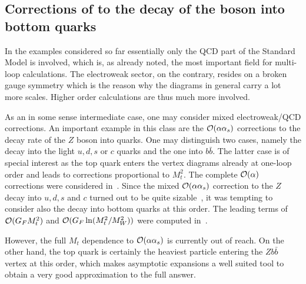 \subsection[Corrections of ${\cal O}(\alpha\alpha_s)$ to the decay of
the $Z$ boson into bottom quarks]{Corrections of  to the decay of the  boson into bottom
  quarks\label{sec::zbb}}
%
In the examples considered so far essentially only the QCD part of the
Standard Model is involved, which is, as already noted, the most
important field for multi-loop calculations. The electroweak sector, on
the contrary, resides on a broken gauge symmetry which is the reason why
the diagrams in general carry a lot more scales. Higher order
calculations are thus much more involved.

As an in some sense intermediate case, one may consider mixed
electroweak/QCD corrections. An important example in this class are the
${\cal O}(\alpha\alpha_s)$ corrections to the decay rate of the $Z$
boson into quarks.  One may distinguish two cases, namely the decay into
the light $u,d,s$ or $c$ quarks and the one into $b\bar{b}$.  The latter
case is of special interest as the top quark enters the vertex diagrams
already at one-loop order and leads to corrections proportional to
$M_t^2$.  The complete ${\cal O}(\alpha)$ corrections were considered
in~\cite{AkhBarRie86,BeeHol88}.  Since the mixed ${\cal
  O}(\alpha\alpha_s)$ correction to the $Z$ decay into $u,d,s$ and $c$
turned out to be quite sizable~\cite{CzaKue96}, it was tempting to
consider also the decay into bottom quarks at this order.  The leading
terms of ${\cal O}(G_F M_t^2)$ and ${\cal O}(G_F \ln(M_t^2/M_W^2))$ were
computed in~\cite{FleJegRacTar92,CheKwiSte93,KwiSte95,Per95}.

However, the full $M_t$ dependence to
${\cal O}(\alpha\alpha_s)$ is currently out of reach.  On the other
hand, the top quark is certainly the heaviest particle entering the $Z b
\bar b$ vertex at this order, which makes asymptotic expansions a
well suited tool to obtain a very good approximation to the full answer.

